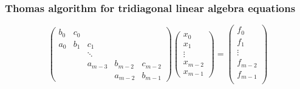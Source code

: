 \documentclass{beamer}
\begin{document}
\begin{frame}
\frametitle{Thomas algorithm for tridiagonal linear algebra equations}

\begin{block}{}
\[
\left( \begin{array}{ccccc}
        b_0 & c_0 &        &         &         \\
	a_0 &  b_1 &  c_1    &         &         \\
	   &    & \ddots  &         &         \\
	      &	    & a_{m-3} & b_{m-2} & c_{m-2} \\
	         &    &         & a_{m-2} & b_{m-1}
   \end{array} \right)
\left( \begin{array}{c}
       x_0     \\
       x_1     \\
       \vdots  \\
       x_{m-2} \\
       x_{m-1}
   \end{array} \right)=\left( \begin{array}{c}
       f_0     \\
       f_1     \\
       \vdots  \\
       f_{m-2} \\
       f_{m-1} \\
   \end{array} \right)
\]
\end{block}
\end{frame}
\end{document}

